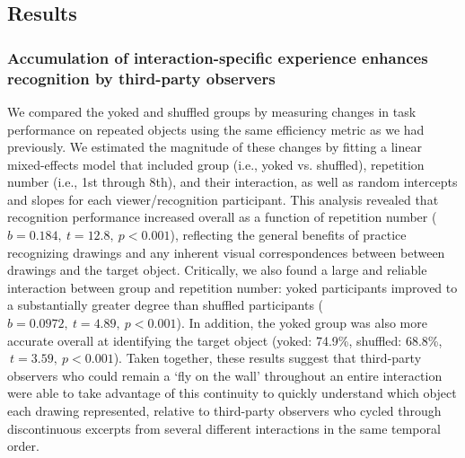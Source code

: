 \documentclass[10pt,letterpaper]{article}
\begin{document}
\subsection{Results}

\subsubsection{Accumulation of interaction-specific experience enhances recognition by third-party observers}



We compared the yoked and shuffled groups by measuring changes in task performance on repeated objects using the same efficiency metric as we had previously. 
We estimated the magnitude of these changes by fitting a linear mixed-effects model that included group (i.e., yoked vs. shuffled), repetition number (i.e., 1st through 8th), and their interaction, as well as random intercepts and slopes for each viewer/recognition participant. 
This analysis revealed that recognition performance increased overall as a function of repetition number ($b = 0.184, ~t = 12.8, ~p < 0.001$), reflecting the general benefits of practice recognizing drawings and any inherent visual correspondences between between drawings and the target object.  %
Critically, we also found a large and reliable interaction between group and repetition number: yoked participants improved to a substantially greater degree than shuffled participants ($b = 0.0972, ~t = 4.89, ~p<0.001$).
In addition, the yoked group was also more accurate overall at identifying the target object (yoked: 74.9\%, shuffled: 68.8\%, $~t = 3.59, ~p < 0.001$). %
Taken together, these results suggest that third-party observers who could remain a `fly on the wall' throughout an entire interaction were able to take advantage of this continuity to quickly understand which object each drawing represented, relative to third-party observers who cycled through discontinuous excerpts from several different interactions in the same temporal order. 
\end{document}
